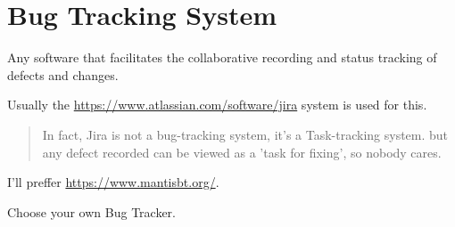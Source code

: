 \section{Bug Tracking System}
\label{sec:Bug Tracking System}

Any software that facilitates the collaborative recording and status tracking of defects and changes.

Usually the \url{https://www.atlassian.com/software/jira} system is used for this.

\begin{quote}
In fact, Jira is not a bug-tracking system, it's a Task-tracking system. but any defect recorded can be viewed as a 'task for fixing', so nobody cares.                                                                                                                                                       \end{quote} 

I'll preffer \url{https://www.mantisbt.org/}.

Choose your own Bug Tracker.
